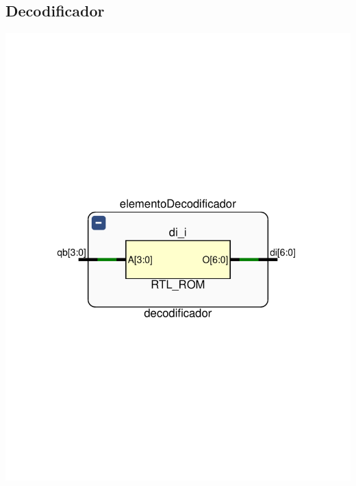 \documentclass[8pt,executivepaper]{article}
\begin{document}
\subsection{Decodificador}
\begin{center}
  \includegraphics[scale=0.4]{rtl/decodificador.pdf}
\end{center}
\end{document}
